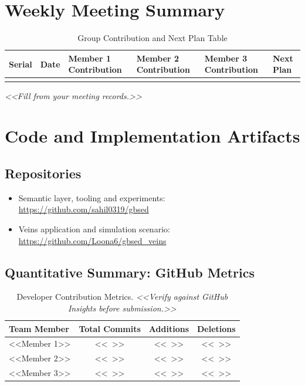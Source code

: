 \documentclass{iutbscthesis}
\begin{document}
\begin{appendices}
\chapter{Weekly Meeting Summary}

\begin{table}[h!]
\centering
\renewcommand{\arraystretch}{1.3}
\setlength{\tabcolsep}{4pt}
\begin{tabular}{|p{0.9cm}|p{1.8cm}|p{2.3cm}|p{2.3cm}|p{2.3cm}|p{2.2cm}|}
\hline
\textbf{Serial} & \textbf{Date} & \textbf{Member 1 Contribution} & \textbf{Member 2 Contribution} & \textbf{Member 3 Contribution} & \textbf{Next Plan} \\ \hline
 &  &  &  &  &  \\ \hline
\end{tabular}
\caption{Group Contribution and Next Plan Table}
\end{table}

\textit{<<Fill from your meeting records.>>}

\chapter{Code and Implementation Artifacts}

\section{Repositories}

\begin{itemize}
    \item Semantic layer, tooling and experiments:\\
    \url{https://github.com/sahil0319/gbsed}
    \item Veins application and simulation scenario:\\
    \url{https://github.com/Loona6/gbsed_veins}
\end{itemize}

\section{Quantitative Summary: GitHub Metrics}

\begin{table}[h]
    \centering
    \caption{Developer Contribution Metrics. \textit{<<Verify against GitHub Insights before submission.>>}}
    \label{tab:metrics}
    \begin{tabular}{l c c c}
        \toprule
        \textbf{Team Member} & \textbf{Total Commits} & \textbf{Additions} & \textbf{Deletions} \\
        \midrule
        <<Member 1>> & <<\ >> & <<\ >> & <<\ >> \\
        <<Member 2>> & <<\ >> & <<\ >> & <<\ >> \\
        <<Member 3>> & <<\ >> & <<\ >> & <<\ >> \\
        \bottomrule
    \end{tabular}
\end{table}


\end{appendices}
\end{document}
